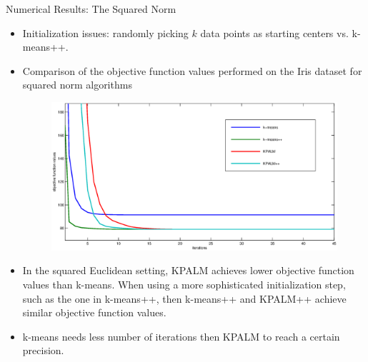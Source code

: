 \documentclass[9pt]{beamer}
\begin{document}
	\begin{frame}{Numerical Results: The Squared Norm}
		\begin{itemize}[<+->]
            \item Initialization issues: randomly picking $k$ data points as starting centers vs. k-means++.
        
        	\item Comparison of the objective function values performed on the Iris dataset for squared norm algorithms
		\begin{figure}
    		\centering
        	\includegraphics[width=0.75 \textwidth]{squared_norm_obj_comp}
		\end{figure}

	    	\item In the squared Euclidean setting, KPALM achieves lower objective function values than k-means. When using a more sophisticated initialization step, such as the one in k-means++, then k-means++ and KPALM++ achieve similar objective function values.
			\item k-means needs less number of iterations then KPALM to reach a certain precision.
		\end{itemize}
	\end{frame}	
	
\end{document}

